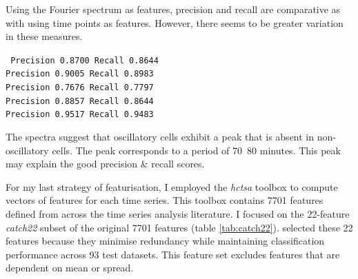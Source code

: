 Using the Fourier spectrum as features, precision and recall are comparative as with using time points as
features.
However, there seems to be greater variation in these measures.

\texttt{
     Precision 0.8700 Recall 0.8644\\
     Precision 0.9005 Recall 0.8983\\
     Precision 0.7676 Recall 0.7797\\
     Precision 0.8857 Recall 0.8644\\
     Precision 0.9517 Recall 0.9483\\
}

The spectra suggest that oscillatory cells exhibit a peak that is absent in non-oscillatory cells.
The peak corresponds to a period of 70~80 minutes.
This peak may explain the good precision \& recall scores.

For my last strategy of featurisation,
I employed the \emph{hctsa} toolbox \citep{fulcherHctsaComputationalFramework2017} to compute vectors of features for each time series.
This toolbox contains 7701 features defined from across the time series analysis literature.
I focused on the 22-feature \emph{catch22} subset of the original 7701 features (table \ref{tab:catch22}).
\citet{lubbaCatch22CAnonicalTimeseries2019} selected these 22 features because they minimise redundancy while maintaining classification performance across 93 test datasets.
This feature set excludes features that are dependent on mean or spread.

